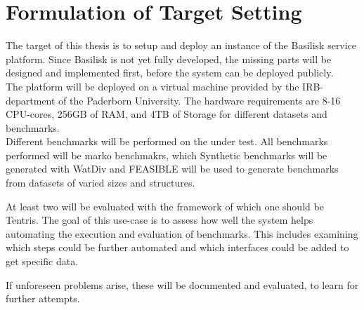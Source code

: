 \chapter{Formulation of Target Setting}
\label{ch:target_setting}

The target of this thesis is to setup and deploy an instance of the Basilisk service platform.
Since Basilisk is not yet fully developed, the missing parts will be designed and implemented first, before the system can be deployed publicly. \\

The platform will be deployed on a virtual machine provided by the IRB-department of the Paderborn University.
The hardware requirements are 8-16 CPU-cores, 256GB of RAM, and 4TB of Storage for different datasets and benchmarks. \\

Different benchmarks will be performed on the \tsp{} under test.
All benchmarks performed will be marko benchmakrs, which 
Synthetic benchmarks will be generated with WatDiv\cite{watdiv} and FEASIBLE\cite{feasible} will be used to generate benchmarks from datasets of varied sizes and structures.


At least two \tsp{} will be evaluated with the framework of which one should be Tentris\cite{tentris}.
The goal of this use-case is to assess how well the system helps automating the execution and evaluation of benchmarks.
This includes examining which steps could be further automated and which interfaces could be added to get specific data.

If unforeseen problems arise, these will be documented and evaluated, to learn for further attempts.





%
%
%
